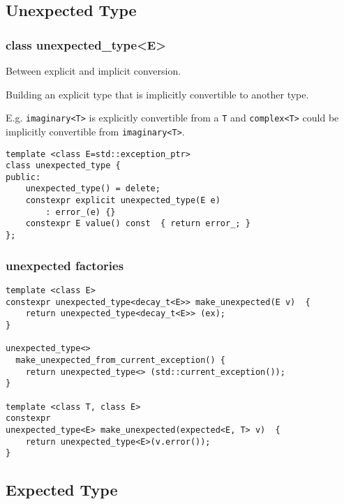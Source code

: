 \documentclass[xcolor=dvipsnames]{beamer}
\newcommand{\cpp}[1]{\lstinline{#1}}
\begin{document}
\subsection{Unexpected Type}
\begin{frame}[fragile]
\frametitle{class unexpected\_type<E>}

Between explicit and implicit conversion.

Building an explicit type that is implicitly convertible to another type.

E.g. \cpp{imaginary<T>} is explicitly convertible from a \cpp{T} and \cpp{complex<T>} could be implicitly convertible from \cpp{imaginary<T>}. 

\begin{lstlisting}
template <class E=std::exception_ptr>
class unexpected_type {
public:
    unexpected_type() = delete;
    constexpr explicit unexpected_type(E e) 
        : error_(e) {}   
    constexpr E value() const  { return error_; }                              
}; 
\end{lstlisting}

\end{frame}
\begin{frame}[fragile]
\frametitle{unexpected factories}

\begin{lstlisting}
template <class E>
constexpr unexpected_type<decay_t<E>> make_unexpected(E v)  {
    return unexpected_type<decay_t<E>> (ex);
}

unexpected_type<> 
  make_unexpected_from_current_exception() {
    return unexpected_type<> (std::current_exception());
}

template <class T, class E>
constexpr 
unexpected_type<E> make_unexpected(expected<E, T> v)  {
    return unexpected_type<E>(v.error());
}

\end{lstlisting}
\end{frame}
\subsection{Expected Type}
\end{document}
